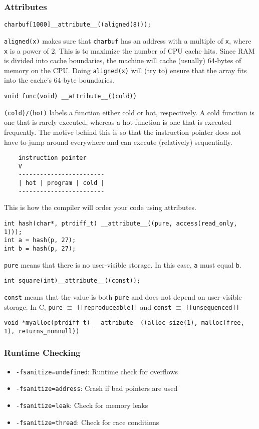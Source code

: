 \documentclass[13pt]{article}
\begin{document}
\subsubsection{Attributes}
\begin{verbatim}
charbuf[1000]__attribute__((aligned(8)));
\end{verbatim}
\texttt{aligned(x)} makes sure that \texttt{charbuf} has an address with a multiple of \texttt{x}, where \texttt{x} is a power of 2. This is to maximize the number of CPU cache hits. Since RAM is divided into cache boundaries, the machine will cache (usually) 64-bytes of memory on the CPU. Doing \texttt{aligned(x)} will (try to) ensure that the array fits into the cache's 64-byte boundaries.
\begin{verbatim}
void func(void) __attribute__((cold))
\end{verbatim}
\texttt{(cold)/(hot)} labels a function either cold or hot, respectively. A cold function is one that is rarely executed, whereas a hot function is one that is executed frequently. The motive behind this is so that the instruction pointer does not have to jump around everywhere and can execute (relatively) sequentially.
\begin{verbatim}
    instruction pointer
    V
    ------------------------
    | hot | program | cold |
    ------------------------
\end{verbatim}
This is how the compiler will order your code using attributes.
\begin{verbatim}
int hash(char*, ptrdiff_t) __attribute__((pure, access(read_only, 1)));
int a = hash(p, 27);
int b = hash(p, 27);
\end{verbatim}
\texttt{pure} means that there is no user-visible storage. In this case, \texttt{a} must equal \texttt{b}.
\begin{verbatim}
int square(int)__attribute__((const));
\end{verbatim}
\texttt{const} means that the value is both \texttt{pure} and does not depend on user-visible storage.
In C, \texttt{pure} $\equiv$ \texttt{[[reproduceable]]} and \texttt{const} $\equiv$ \texttt{[[unsequenced]]}
\begin{verbatim}
void *myalloc(ptrdiff_t) __attribute__((alloc_size(1), malloc(free, 1), returns_nonnull))
\end{verbatim}

\subsubsection{Runtime Checking}
\begin{itemize}[label=]
\item \texttt{-fsanitize=undefined}: Runtime check for overflows
\item \texttt{-fsanitize=address}: Crash if bad pointers are used
\item \texttt{-fsanitize=leak}: Check for memory leaks
\item \texttt{-fsanitize=thread}: Check for race conditions
\end{itemize}
\end{document}

